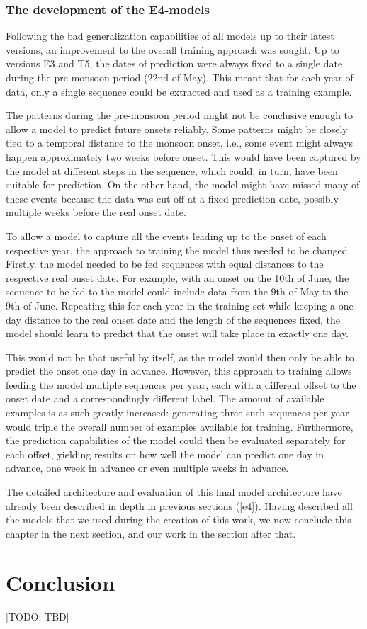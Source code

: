 \subsubsection{The development of the E4-models}
\label{sst:nn_e4}
Following the bad generalization capabilities of all models up to their latest versions, an improvement to the overall training approach was sought. Up to versions E3 and T5, the dates of prediction were always fixed to a single date during the pre-monsoon period (22nd of May). This meant that for each year of data, only a single sequence could be extracted and used as a training example.

The patterns during the pre-monsoon period might not be conclusive enough to allow a model to predict future onsets reliably. Some patterns might be closely tied to a temporal distance to the monsoon onset, i.e., some event might always happen approximately two weeks before onset. This would have been captured by the model at different steps in the sequence, which could, in turn, have been suitable for prediction. On the other hand, the model might have missed many of these events because the data was cut off at a fixed prediction date, possibly multiple weeks before the real onset date.

To allow a model to capture all the events leading up to the onset of each respective year, the approach to training the model thus needed to be changed. Firstly, the model needed to be fed sequences with equal distances to the respective real onset date. For example, with an onset on the 10th of June, the sequence to be fed to the model could include data from the 9th of May to the 9th of June. Repeating this for each year in the training set while keeping a one-day distance to the real onset date and the length of the sequences fixed, the model should learn to predict that the onset will take place in exactly one day.

This would not be that useful by itself, as the model would then only be able to predict the onset one day in advance. However, this approach to training allows feeding the model multiple sequences per year, each with a different offset to the onset date and a correspondingly different label. The amount of available examples is as such greatly increased: generating three such sequences per year would triple the overall number of examples available for training. Furthermore, the prediction capabilities of the model could then be evaluated separately for each offset, yielding results on how well the model can predict one day in advance, one week in advance or even multiple weeks in advance.

The detailed architecture and evaluation of this final model architecture have already been described in depth in previous sections (\cref{e4}). Having described all the models that we used during the creation of this work, we now conclude this chapter in the next section, and our work in the section after that.

\section{Conclusion}
[TODO: TBD]
